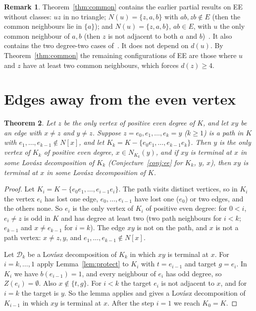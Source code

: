 \documentclass[11pt]{amsart}
\newtheorem{theorem}{Theorem}[section]
\theoremstyle{definition}
\newtheorem{remark}[theorem]{Remark}
\newcommand{\cD}{\mathcal D}
\begin{document}
\begin{remark}\label{rem:covers}
Theorem~\ref{thm:common} contains the earlier partial results on EE without classes: $uz$ in no
triangle; $N(u)=\{z,a,b\}$ with $ab,zb\notin E$ (then the common neighbours lie in $\{a\}$); and
$N(u)=\{z,a,b\}$, $ab\in E$, with $u$ the only common neighbour of $a,b$ (then $z$ is not adjacent to
both $a$ and $b$)~\cite[Proposition~18]{MS}. It also contains the two degree-two cases
of~\cite[Theorem~5.1]{STL}. It does not depend on $d(u)$. By Theorem~\ref{thm:common} the
remaining configurations of EE are those where $u$ and $z$ have at least two common neighbours,
which forces $d(z)\ge4$.
\end{remark}

\section{Edges away from the even vertex}\label{sec:away}

\begin{theorem}\label{thm:path}
Let $z$ be the only vertex of positive even degree of $K$, and let $xy$ be an edge with $x\ne z$ and
$y\ne z$. Suppose $z=e_0,e_1,\dots,e_k=y$ ($k\ge1$) is a path in $K$ with $e_1,\dots,e_{k-1}\notin
N[x]$, and let $K_k=K-\{e_0e_1,\dots,e_{k-1}e_k\}$. Then $y$ is the only vertex of $K_k$ of positive
even degree, $x\in N_{K_k}(y)$, and if $xy$ is terminal at $x$ in some Lov\'asz decomposition of $K_k$
(Conjecture~\ref{conj:ee} for $K_k$, $y$, $x$), then $xy$ is terminal at $x$ in some Lov\'asz
decomposition of $K$.
\end{theorem}

\begin{proof}
Let $K_i=K-\{e_0e_1,\dots,e_{i-1}e_i\}$. The path visits distinct vertices, so in $K_i$ the vertex
$e_i$ has lost one edge, $e_0,\dots,e_{i-1}$ have lost one ($e_0$) or two edges, and the others none.
So $e_i$ is the only vertex of $K_i$ of positive even degree: for $0<i$, $e_i\ne z$ is odd in $K$ and has
degree at least two (two path neighbours for $i<k$; $e_{k-1}$ and $x\ne e_{k-1}$ for $i=k$). The edge
$xy$ is not on the path, and $x$ is not a path vertex: $x\ne z,y$, and $e_1,\dots,e_{k-1}\notin N[x]$.

Let $\cD_k$ be a Lov\'asz decomposition of $K_k$ in which $xy$ is terminal at $x$. For $i=k,\dots,1$
apply Lemma~\ref{lem:protect} to $K_i$ with $t=e_{i-1}$ and target $g=e_i$. In $K_i$ we have
$b(e_{i-1})=1$, and every neighbour of $e_i$ has odd degree, so $Z(e_i)=\emptyset$. Also
$x\notin\{t,g\}$. For $i<k$ the target $e_i$ is not adjacent to $x$, and for $i=k$ the target is $y$. So
the lemma applies and gives a Lov\'asz decomposition of $K_{i-1}$ in which $xy$ is terminal at $x$.
After the step $i=1$ we reach $K_0=K$.
\end{proof}
\end{document}
